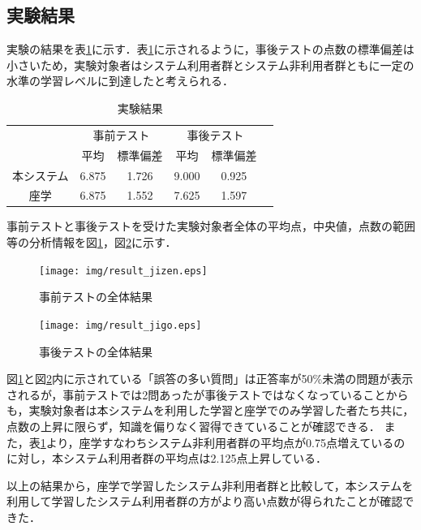 \subsection{実験結果}
実験の結果を表\ref{tab:result1}に示す．表\ref{tab:result1}に示されるように，事後テストの点数の標準偏差は小さいため，実験対象者はシステム利用者群とシステム非利用者群ともに一定の水準の学習レベルに到達したと考えられる．
\begin{table}[tb]
    \centering
    \caption{実験結果}
    \label{tab:result1}
    \begin{tabular}{|c|c|c|c|c|c}
    \hline
     & \multicolumn{2}{c|}{事前テスト} & \multicolumn{2}{c|}{事後テスト} \\ \cline{2-5}
     & 平均 & 標準偏差 & 平均 & 標準偏差 \\ \hline
     本システム & 6.875 & 1.726 & 9.000 & 0.925 \\ \hline
     座学 & 6.875 & 1.552 & 7.625 & 1.597 \\ \hline
    \end{tabular}
\end{table}

事前テストと事後テストを受けた実験対象者全体の平均点，中央値，点数の範囲等の分析情報を図\ref{fig:result_jizen}，図\ref{fig:result_jigo}に示す．


\begin{figure}[htbp]
\begin{center}
\texttt{[image: img/result\_jizen.eps]}
\end{center}
\caption{事前テストの全体結果}
\label{fig:result_jizen}
\end{figure}

\begin{figure}[htbp]
\begin{center}
\texttt{[image: img/result\_jigo.eps]}
\end{center}
\caption{事後テストの全体結果}
\label{fig:result_jigo}
\end{figure}

図\ref{fig:result_jizen}と図\ref{fig:result_jigo}内に示されている「誤答の多い質問」は正答率が50\%未満の問題が表示されるが，事前テストでは2問あったが事後テストではなくなっていることからも，実験対象者は本システムを利用した学習と座学でのみ学習した者たち共に，点数の上昇に限らず，知識を偏りなく習得できていることが確認できる．
また，表\ref{tab:result1}より，座学すなわちシステム非利用者群の平均点が0.75点増えているのに対し，本システム利用者群の平均点は2.125点上昇している．

以上の結果から，座学で学習したシステム非利用者群と比較して，本システムを利用して学習したシステム利用者群の方がより高い点数が得られたことが確認できた．

